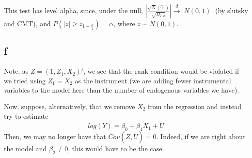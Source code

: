 \documentclass[12pt]{paper}
\begin{document}
This test has level alpha, since, under the null, $|\frac{\sqrt{N}(\hat \gamma_1)}{\sqrt{\Omega_{2,2}}}|\overset{d}{\to}|N(0,1)|$ (by slutsky and CMT), and $P(|z|\ge z_{1-\frac{\alpha}{2}})=\alpha$, where $z\sim N(0,1)$.

\subsection*{f} Note, as $Z = (1,Z_1,X_2)'$, we see that the rank condition would be violated if we tried using $Z_1 = X_2$ as the instrument (we are adding fewer instrumental variables to the model here than the number of endogenous variables we have). \par
Now, suppose, alternatively, that we remove $X_2$ from the regression and instead try to estimate 
$$log(Y) = \beta_0 + \beta_1 X_1 + \tilde U$$
Then, we may no longer have that $Cov(Z,\tilde U) = 0$. Indeed, if we are right about the model and $\beta_2 \neq 0$, this would have to be the case.
\end{document}
